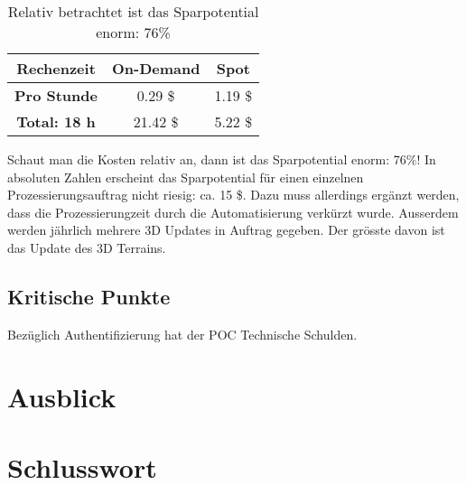 \begin{table}[!htbp]
\begin{center}
\begin{tabular}{| c | c | c |}
    \hline
	\textbf{Rechenzeit} & \textbf{On-Demand} & \textbf{Spot}\\
	\hline
	 \textbf{Pro Stunde} & 0.29 \$ & 1.19 \$\\
	\hline
	 \textbf{Total: 18 h} & 21.42 \$ & 5.22 \$\\
	\hline
\end{tabular}
\caption{\label{tab:price_difference}Relativ betrachtet ist das Sparpotential enorm: 76\%}
\end{center}
\end{table}

Schaut man die Kosten relativ an, dann ist das Sparpotential enorm: 76\%! In absoluten Zahlen erscheint das Sparpotential für einen einzelnen Prozessierungsauftrag nicht riesig: ca. 15 \$. Dazu muss allerdings ergänzt werden, dass die Prozessierungzeit durch die Automatisierung verkürzt wurde. Ausserdem werden jährlich mehrere 3D Updates in Auftrag gegeben. Der grösste davon ist das Update des 3D Terrains.

\subsection{Kritische Punkte}
Bezüglich Authentifizierung hat der POC Technische Schulden.


\section{Ausblick}

\section{Schlusswort}
